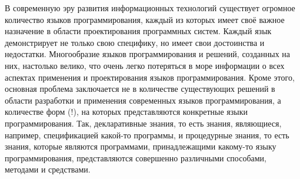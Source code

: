 В современную эру развития информационных технологий существует огромное количество языков программирования, каждый из которых имеет своё важное назначение в области проектирования программных систем. Каждый язык демонстрирует не только свою специфику, но имеет свои достоинства и недостатки. Многообразие языков программирования \cite{Sebesta2012} и решений, созданных на них, настолько велико, что очень легко потеряться в море информации о всех аспектах применения и проектирования языков программирования. Кроме этого, основная проблема заключается не в количестве существующих решений в области разработки и применения современных языков программирования, а количестве форм (!), на которых представляются конкретные языки программирования. Так, декларативные знания, то есть знания, являющиеся, например, спецификацией какой-то программы, и процедурные знания, то есть знания, которые являются программами, принадлежащими какому-то языку программирования, представляются совершенно различными способами, методами и средствами.

